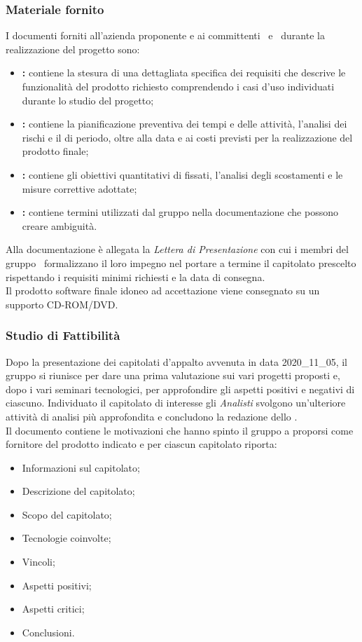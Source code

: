 \subsubsection{Materiale fornito} 
I documenti forniti all'azienda proponente e ai committenti \VT\ e \CR\ durante la realizzazione del progetto sono:
\begin{itemize}
	\item \textbf{\textit{\AdR}:} contiene la stesura di una dettagliata specifica dei requisiti che descrive le funzionalità del prodotto richiesto comprendendo i casi d'uso individuati durante lo studio del progetto;
	\item \textbf{\textit{\PdP}:} contiene la pianificazione preventiva dei tempi e delle attività, l’analisi dei rischi e il  di periodo, oltre alla data e ai costi previsti per la realizzazione del prodotto finale;
	\item \textbf{\textit{\PdQ}:} contiene gli obiettivi quantitativi di  fissati, l'analisi degli scostamenti e le misure correttive adottate;
	\item \textbf{\textit{\Glossario}:} contiene termini utilizzati dal gruppo nella documentazione che possono creare ambiguità.
\end{itemize}
Alla documentazione è allegata la \textit{Lettera di Presentazione} con cui i membri del gruppo \Gruppo\ formalizzano il loro impegno nel portare a termine il capitolato prescelto rispettando i requisiti minimi richiesti e la data di consegna.\\
Il prodotto software finale idoneo ad accettazione viene consegnato su un supporto CD-ROM/DVD.

\subsubsection{Studio di Fattibilità}\label{SdF}
Dopo la presentazione dei capitolati d'appalto avvenuta in data 2020\_11\_05, il gruppo si riunisce per dare una prima valutazione sui vari progetti proposti e, dopo i vari seminari tecnologici, per approfondire gli aspetti positivi e negativi di ciascuno. Individuato il capitolato di interesse gli \textit{Analisti} svolgono un'ulteriore attività di analisi più approfondita e concludono la redazione dello \SdFv.\\
Il documento contiene le motivazioni che hanno spinto il gruppo a proporsi come fornitore del prodotto indicato e per ciascun capitolato riporta:
\begin{itemize}
\item Informazioni sul capitolato;
\item Descrizione del capitolato;
\item Scopo del capitolato;
\item Tecnologie coinvolte; 
\item Vincoli;
\item Aspetti positivi;
\item Aspetti critici;
\item Conclusioni.
\end{itemize}

